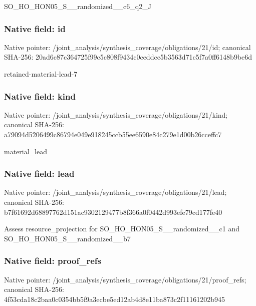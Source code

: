 \documentclass[10pt,a4paper]{article}
\begin{document}
\begingroup\raggedright\sloppy SO\_\allowbreak{}HO\_\allowbreak{}HON05\_\allowbreak{}S\_\allowbreak{}\_\allowbreak{}randomized\_\allowbreak{}\_\allowbreak{}c6\_\allowbreak{}q2\_\allowbreak{}J\par\endgroup

\subsubsection{Native field: id}
Native pointer: /joint\_\allowbreak{}analysis/synthesis\_\allowbreak{}coverage/obligations/21/id; canonical SHA-256: 20ad6c87c364725f99c5c808f9434c0ceddcc5b3563d71c5f7a0ff6148b9be6d

\begingroup\raggedright\sloppy retained-material-lead-7\par\endgroup

\subsubsection{Native field: kind}
Native pointer: /joint\_\allowbreak{}analysis/synthesis\_\allowbreak{}coverage/obligations/21/kind; canonical SHA-256: a79094d5206499c86794e049e918245ccb55ee6590e84c279e1d00b26cceffc7

\begingroup\raggedright\sloppy material\_\allowbreak{}lead\par\endgroup

\subsubsection{Native field: lead}
Native pointer: /joint\_\allowbreak{}analysis/synthesis\_\allowbreak{}coverage/obligations/21/lead; canonical SHA-256: b7f61692d68897762d151ac9302129477b8f366a0f0442d993efe79cd177fe40

\begingroup\raggedright\sloppy Assess resource\_\allowbreak{}projection for SO\_\allowbreak{}HO\_\allowbreak{}HON05\_\allowbreak{}S\_\allowbreak{}\_\allowbreak{}randomized\_\allowbreak{}\_\allowbreak{}c1 and SO\_\allowbreak{}HO\_\allowbreak{}HON05\_\allowbreak{}S\_\allowbreak{}\_\allowbreak{}randomized\_\allowbreak{}\_\allowbreak{}b7\par\endgroup

\subsubsection{Native field: proof\_\allowbreak{}refs}
Native pointer: /joint\_\allowbreak{}analysis/synthesis\_\allowbreak{}coverage/obligations/21/proof\_\allowbreak{}refs; canonical SHA-256: 4f53cda18c2baa0c0354bb5f9a3ecbe5ed12ab4d8e11ba873c2f11161202b945
\end{document}
